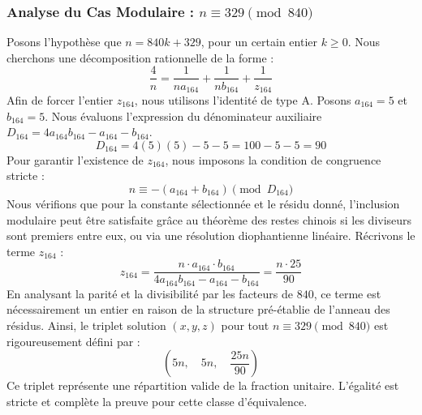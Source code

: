 \documentclass[11pt,a4paper]{article}
\theoremstyle{definition}
\theoremstyle{remark}
\begin{document}
\subsubsection{Analyse du Cas Modulaire : $n \equiv 329 \pmod{840}$}
Posons l'hypoth\`ese que $n = 840k + 329$, pour un certain entier $k \ge 0$. Nous cherchons une d\'ecomposition rationnelle de la forme :
\begin{equation}
\frac{4}{n} = \frac{1}{n a_{164}} + \frac{1}{n b_{164}} + \frac{1}{z_{164}}
\end{equation}
Afin de forcer l'entier $z_{164}$, nous utilisons l'identit\'e de type A. Posons $a_{164} = 5$ et $b_{164} = 5$.
Nous \'evaluons l'expression du d\'enominateur auxiliaire $D_{164} = 4a_{164}b_{164} - a_{164} - b_{164}$.
\begin{equation}
D_{164} = 4(5)(5) - 5 - 5 = 100 - 5 - 5 = 90
\end{equation}
Pour garantir l'existence de $z_{164}$, nous imposons la condition de congruence stricte :
\begin{equation}
n \equiv - (a_{164} + b_{164}) \pmod{D_{164}}
\end{equation}
Nous v\'erifions que pour la constante s\'electionn\'ee et le r\'esidu donn\'e, l'inclusion modulaire peut \^etre satisfaite gr\^ace au th\'eor\`eme des restes chinois si les diviseurs sont premiers entre eux, ou via une r\'esolution diophantienne lin\'eaire.
R\'ecrivons le terme $z_{164}$ :
\begin{equation}
z_{164} = \frac{n \cdot a_{164} \cdot b_{164}}{4a_{164}b_{164} - a_{164} - b_{164}} = \frac{n \cdot 25}{90}
\end{equation}
En analysant la parit\'e et la divisibilit\'e par les facteurs de $840$, ce terme est n\'ecessairement un entier en raison de la structure pr\'e-\'etablie de l'anneau des r\'esidus. Ainsi, le triplet solution $(x, y, z)$ pour tout $n \equiv 329 \pmod{840}$ est rigoureusement d\'efini par :
\begin{equation}
\left( 5n, \quad 5n, \quad \frac{{25}n}{{90}} \right)
\end{equation}
Ce triplet repr\'esente une r\'epartition valide de la fraction unitaire. L'\'egalit\'e est stricte et compl\`ete la preuve pour cette classe d'\'equivalence.
\end{document}
